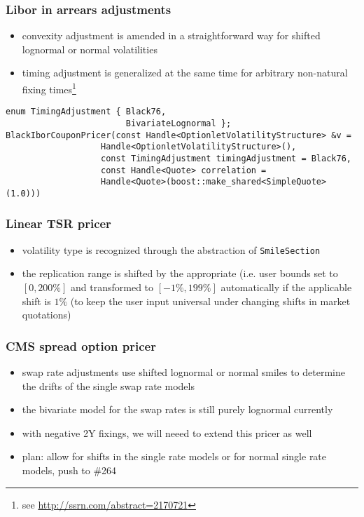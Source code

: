 \documentclass{beamer}
\begin{document}
\begin{frame}[fragile]
\frametitle{Libor in arrears adjustments}
\begin{itemize}
\item convexity adjustment is amended in a straightforward way for  shifted lognormal or normal volatilities
\item timing adjustment is generalized at the same time for arbitrary non-natural fixing times\footnote{see \url{http://ssrn.com/abstract=2170721}}
\end{itemize}
\begin{verbatim}
enum TimingAdjustment { Black76,
                        BivariateLognormal };
BlackIborCouponPricer(const Handle<OptionletVolatilityStructure> &v =
                   Handle<OptionletVolatilityStructure>(),
                   const TimingAdjustment timingAdjustment = Black76,
                   const Handle<Quote> correlation =
                   Handle<Quote>(boost::make_shared<SimpleQuote>(1.0)))
\end{verbatim}
\end{frame}

\begin{frame}[fragile]
\frametitle{Linear TSR pricer}
\begin{itemize}
\item volatility type is recognized through the abstraction of \verb+SmileSection+
\item the replication range is shifted by the appropriate (i.e. user bounds set to $[0,200\%]$ and transformed to $[-1\%,199\%]$ automatically if the applicable shift is $1\%$ (to keep the user input universal under changing shifts in market quotations)
\end{itemize}
\end{frame}

\begin{frame}[fragile]
\frametitle{CMS spread option pricer}
\begin{itemize}
\item swap rate adjustments use shifted lognormal or normal smiles to determine the drifts of the single swap rate models
\item the bivariate model for the swap rates is still purely lognormal currently
\item with negative 2Y fixings, we will neeed to extend this pricer as well
\item plan: allow for shifts in the single rate models or for normal single rate models, push to \#264
\end{itemize}
\end{frame}
\end{document}
